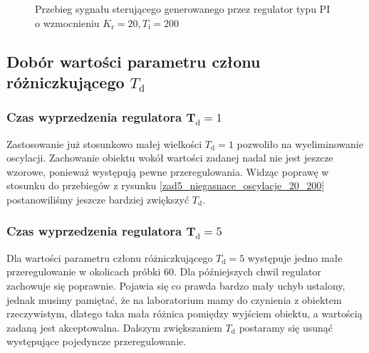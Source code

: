 \begin{figure}[b]
    \centering
    \caption{Przebieg sygnału sterującego generowanego przez regulator typu PI o wzmocnieniu $K_{\mathrm{r}} = \num{20}, T_{\mathrm{i}} = 200$}
    \label{zad5_niegasnace_oscylacje_ster_20_200}
\end{figure}
\FloatBarrier

\subsection{Dobór wartości parametru członu różniczkującego $T_{\mathrm{d}}$ }
\subsubsection{Czas wyprzedzenia regulatora $\mathbf{T_{\mathrm{d}}}=\num{1}$}
Zastosowanie już stosunkowo małej wielkości $T_{\mathrm{d}} = 1$ pozwoliło na wyeliminowanie oscylacji. Zachowanie obiektu wokół wartości zadanej nadal nie jest jeszcze wzorowe, ponieważ występują pewne przeregulowania. Widząc poprawę w stosunku do przebiegów z rysunku  \ref{zad5_niegasnace_oscylacje_20_200} postanowiliśmy jeszcze bardziej zwiększyć $T_{\mathrm{d}}$.

\subsubsection{Czas wyprzedzenia regulatora $\mathbf{T_{\mathrm{d}}}=\num{5}$}
Dla wartości parametru członu różniczkującego $T_{\mathrm{d}} = 5$ występuje jedno małe przeregulowanie w okolicach próbki 60. Dla późniejszych chwil regulator zachowuje się poprawnie. Pojawia się co prawda bardzo mały uchyb ustalony, jednak musimy pamiętać, że na laboratorium mamy do czynienia z obiektem rzeczywistym, dlatego taka mała różnica pomiędzy wyjściem obiektu, a wartością zadaną jest akceptowalna. Dalszym zwiększaniem $T_{\mathrm{d}}$ postaramy się usunąć występujące pojedyncze przeregulowanie. 

